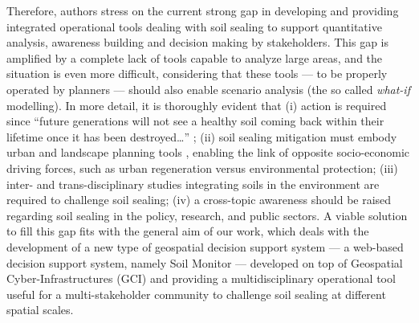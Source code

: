 \documentclass[APA,LATO1COL,doublespace]{WileyNJD-v2}
\begin{document}
Therefore, authors stress on the current
strong gap in developing and providing integrated operational tools 
dealing with soil sealing 
to support quantitative analysis, awareness building and decision making by stakeholders.
This gap is amplified by a complete lack of tools 
capable to analyze large areas, and the situation is even more difficult, considering that these tools --- to be properly operated by planners --- should also enable scenario analysis (the so called \textit{what-if} modelling).
In more detail, it is thoroughly evident that 
(i) action is required since ``future generations will not see a healthy soil coming back within their lifetime once it has been destroyed\dots'' \citep{SWD12}; 
(ii) soil sealing mitigation must embody urban and landscape planning tools \citep{Artmann14}, enabling the link of opposite socio-economic driving forces, such as urban regeneration versus environmental protection; 
(iii) inter- and trans-disciplinary studies integrating soils in the environment are required to challenge soil sealing;
(iv) a cross-topic awareness should be raised regarding soil sealing in the policy, research, and public sectors.
A viable solution to fill this gap fits with the general aim of our work, which deals with the development of
a new type of geospatial decision support system --- a web-based decision support system, namely Soil Monitor --- developed on top of Geospatial Cyber-Infrastructures (GCI) and providing a multidisciplinary operational tool useful for a multi-stakeholder community to challenge soil sealing at different spatial scales.

\end{document}
